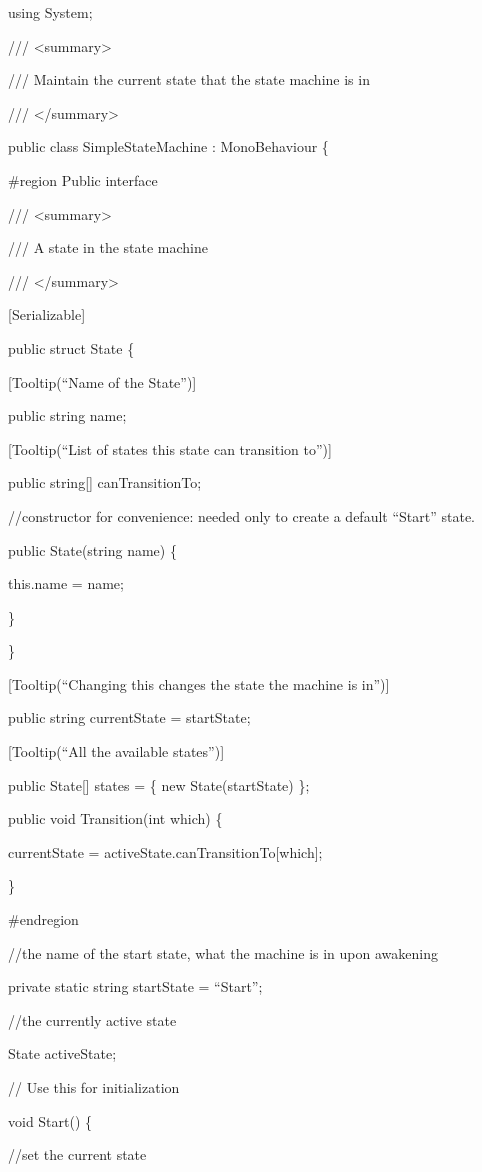 using System;

/// \textless{}summary\textgreater{}

/// Maintain the current state that the state machine is in

/// \textless{}/summary\textgreater{}

public class SimpleStateMachine : MonoBehaviour \{

\#region Public interface

/// \textless{}summary\textgreater{}

/// A state in the state machine

/// \textless{}/summary\textgreater{}

{[}Serializable{]}

public struct State \{

{[}Tooltip(``Name of the State''){]}

public string name;

{[}Tooltip(``List of states this state can transition to''){]}

public string{[}{]} canTransitionTo;

//constructor for convenience: needed only to create a default ``Start''
state.

public State(string name) \{

this.name = name;

\}

\}

{[}Tooltip(``Changing this changes the state the machine is in''){]}

public string currentState = startState;

{[}Tooltip(``All the available states''){]}

public State{[}{]} states = \{ new State(startState) \};

public void Transition(int which) \{

currentState = activeState.canTransitionTo{[}which{]};

\}

\#endregion

//the name of the start state, what the machine is in upon awakening

private static string startState = ``Start'';

//the currently active state

State activeState;

// Use this for initialization

void Start() \{

//set the current state

